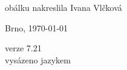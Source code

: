 \vspace*{\fill}
\hspace{10mm}obálku nakreslila Ivana Vlčková\\
\begin{otherlanguage}{czech}
Brno, \today\\
\end{otherlanguage}
verze 7.21\\
vysázeno jazykem \LaTeXe
\vspace{2cm}
\newpage
